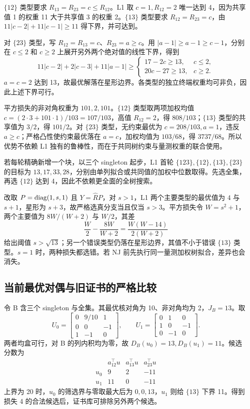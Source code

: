 $\{12\}$ 类型要求 $R_{13}=R_{23}=c\le R_{12}$。L1 取 $c=1,R_{12}=2$ 唯一达到 4，因为共享值 1 的权重 11 大于共享值 3 的权重 2。$\{13\}$ 类型要求 $R_{12}=R_{23}=c$，由 $11|c-2|+11|c-1|\ge11$ 得下界，并可达到。

对 $\{23\}$ 类型，写 $R_{12}=R_{13}=c$、$R_{23}=a\ge c$。用 $|a-1|\ge a-1\ge c-1$，分别在 $c\le2$ 和 $c\ge2$ 上展开另外两个绝对值的线性下界，得到
\[
 11|c-2|+2|c-3|+11|a-1|
 \ge\begin{cases}17-2c\ge13,&c\le2,\\20c-27\ge13,&c\ge2.\end{cases}
\]
$a=c=2$ 达到 13，故最优解落在星形边界。各类型的独立终端权重均可非负，因此上述下界可行。

平方损失的非对角权重为 $101,2,101$。$\{12\}$ 类型取两项加权均值 $c=(2\cdot3+101\cdot1)/103=107/103$，高值 $R_{12}=2$，得 $808/103$；$\{13\}$ 类型的共享值为 $3/2$，得 $101/2$。对 $\{23\}$ 类型，无约束最优为 $c=208/103,a=1$，违反 $a\ge c$；严格凸性使约束最优落在 $a=c$，加权均值为 $103/68$，得 $3737/68$。所以优势不依赖 L1 独有的鲁棒性，而在于共同树约束与量测权重的联合使用。

若每轮精确新增一个块，以三个 singleton 起步，L1 首轮 $\{123\},\{12\},\{13\},\{23\}$ 的目标为 $13,17,33,28$，分别由单列拟合或共同值的加权中位数取得。先选全集，再选 $\{12\}$ 达到 4，因此不依赖更全面的全树搜索。

改取 $P=\operatorname{diag}(1,s,1)$ 且 $Y=\widehat RP$，对 $s>1$，L1 两个主要类型的最优值为 $4$ 与 $s+1$，星形为 $s+3$，故严格选真分支当且仅当 $s>3$。平方损失令 $W=s^2+1$，两个主要值为 $8W/(W+2)$ 与 $W/2$，其差
\[
 \frac W2-\frac{8W}{W+2}=\frac{W(W-14)}{2(W+2)}
\]
给出阈值 $s>\sqrt{13}$；另一个错误类型仍落在星形边界，其值不小于错误 $\{13\}$ 类型。$s=1$ 时，两种损失都选错。若 NJ 前先执行同一量测加权树拟合，差异也会消失。

\subsection{当前最优对偶与旧证书的严格比较}
令 B 含三个 singleton 与全集。其最优核对角为 10、非对角均为 2，$J_B=13$。取
\begin{equation}
 U_0=\begin{bmatrix}0&9/10&1\\0&0&-1\\1&-1&0\end{bmatrix},\qquad
 U_1=\begin{bmatrix}0&1&0\\1&0&-1\\0&-1&0\end{bmatrix}.
 \label{eq:duals}
\end{equation}
两者均盒可行，对 B 的列内积均为零，故 $D_B(u_0)=13,D_B(u_1)=11$。候选分数为
\begin{equation}
 \begin{array}{c|rrr}
 &a_{12}^\top u&a_{13}^\top u&a_{23}^\top u\\\hline
 u_0&9&2&-11\\
 u_1&11&0&-11
 \end{array}
 \label{eq:scores}
\end{equation}
上界为 20 时，$u_0$ 的筛选界与零取最大后为 $0,0,13$，$u_1$ 则给 $\{13\}$ 下界 11。得到损失 4 的合法候选后，证书库可排除另外两个候选。

